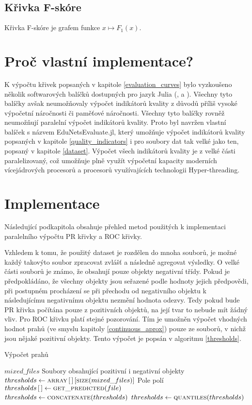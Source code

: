 \subsection{Křivka F-skóre}
Křivka F-skóre je grafem funkce \( x \mapsto F_1 \left( x \right) \).

\section{Proč vlastní implementace?}
K výpočtu křivek popsaných v kapitole \ref{evaluation_curves} bylo vyzkoušeno několik softwarových balíčků dostupných pro jazyk Julia (\cite{zea_roc.jl:_2015}, \cite{leeuwen_rocanalysis.jl:_2016} a \cite{lin_mlbase.jl:_2017}). Všechny tyto balíčky avšak neumožňovaly výpočet indikátorů kvality z důvodů příliš vysoké výpočetní náročnosti či paměťové náročnosti. Všechny tyto balíčky rovněž neumožňují paralelní výpočet indikátorů kvality. Proto byl navržen vlastní balíček s názvem EduNetsEvaluate.jl, který umožňuje výpočet indikátorů kvality popsaných v kapitole \ref{quality_indicators} i pro soubory dat tak velké jako ten, popsaný v kapitole \ref{dataset}. Výpočet všech indikátorů kvality je z velké části paralelizovaný, což umožňuje plně využít výpočetní kapacity moderních vícejádrových procesorů a procesorů využívajících technologii Hyper-threading.

\section{Implementace}
Následující podkapitola obsahuje přehled metod použitých k implementaci paralelního výpočtu PR křivky a ROC křivky.

Vzhledem k tomu, že použitý dataset je rozdělen do mnoha souborů, je možné každý takovýto soubor zpracovat zvlášť a následně agregovat výsledky. O velké části souborů je známo, že obsahují pouze objekty negativní třídy. Pokud je předpokládáno, že všechny objekty jsou seřazené podle hodnoty jejich předpovědi, při postupném procházení se při přechodu od negativního objektu k následujícímu negativnímu objektu nezmění hodnota odezvy. Tedy pokud bude PR křivka počítána pouze z pozitivních objektů, na její tvar to nebude mít žádný vliv. Pro ROC křivku platí stejné pozorování. Tím je umožněn výpočet vhodných hodnot prahů (ve smyslu kapitoly \ref{continuous_aprox}) pouze ze souborů, v nichž jsou nějaké pozitivní objekty. Tento výpočet je popsán v algoritmu \ref{thresholds}.

\begin{algorithm}
	\caption{Výpočet prahů}
	\label{thresholds}
	\begin{algorithmic}
		\Require $ mixed\_files $ \Comment Soubory obsahující pozitivní i negativní objekty
		\Statex
		\State $ thresholds \gets \Call{array}{} \left[ \, \right] \left[ \Call{size}{mixed\_files} \right] $ \Comment Pole polí
			\State $ thresholds \left[ \, \right] \gets \Call{get\_predicted}{file} $
		\EndFor
		\State $ thresholds \gets \Call{concatenate}{thresholds} $
		\State $ thresholds \gets \Call{quantiles}{thresholds} $
	\end{algorithmic}
\end{algorithm}

